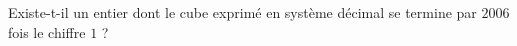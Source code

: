 Existe-t-il un entier dont le cube exprimé en système décimal se termine par $2006$ fois le chiffre $1$ ?
